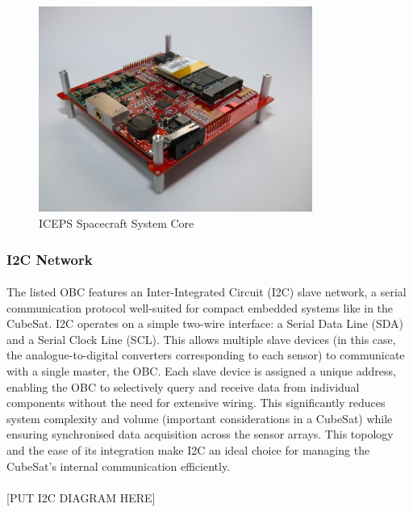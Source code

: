 \documentclass[11pt]{article}
\begin{document}
	\begin{figure}[H]
		\centering
		\includegraphics[width=0.8\textwidth]{OBC.jpg}
		\caption{ICEPS Spacecraft System Core}
	\end{figure}
	
	\subsubsection{I2C Network}
	
	\paragraph{}The listed OBC features an Inter-Integrated Circuit (I2C) slave network, a serial communication protocol well-suited for compact embedded systems like in the CubeSat. I2C operates on a simple two-wire interface: a Serial Data Line (SDA) and a Serial Clock Line (SCL). This allows multiple slave devices (in this case, the analogue-to-digital converters corresponding to each sensor) to communicate with a single master, the OBC. Each slave device is assigned a unique address, enabling the OBC to selectively query and receive data from individual components without the need for extensive wiring. This significantly reduces system complexity and volume (important considerations in a CubeSat) while ensuring synchronised data acquisition across the sensor arrays. This topology and the ease of its integration make I2C an ideal choice for managing the CubeSat’s internal communication efficiently.
	
	\paragraph{}[PUT I2C DIAGRAM HERE]
	
\end{document}
